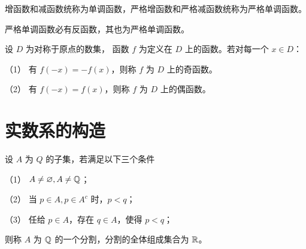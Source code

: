 增函数和减函数统称为单调函数，严格增函数和严格减函数统称为严格单调函数。

严格单调函数必有反函数，其也为严格单调函数。

\begin{definition}
	设 $D$ 为对称于原点的数集， 函数 $f$ 为定义在 $D$ 上的函数。若对每一个 $x\in D$：

	（1） 有 $f(-x) = -f(x)$，则称 $f$ 为 $D$ 上的奇函数。

	（2） 有 $f(-x) = f(x)$，则称 $f$ 为 $D$ 上的偶函数。
\end{definition}

\section{实数系的构造}

\begin{definition}[Dedekind 分割]
	设 $A$ 为 $Q$ 的子集，若满足以下三个条件

	（1） $A \ne \varnothing,A \ne \mathbb{Q}$；

	（2） 当 $p\in A,p \in A^c$ 时，$p<q$；

	（3） 任给 $p \in A$，存在 $q \in A$，使得 $p<q$；

	则称 $A$ 为 $\mathbb{Q}$ 的一个分割，分割的全体组成集合为 $\mathbb{R}$。
\end{definition}

